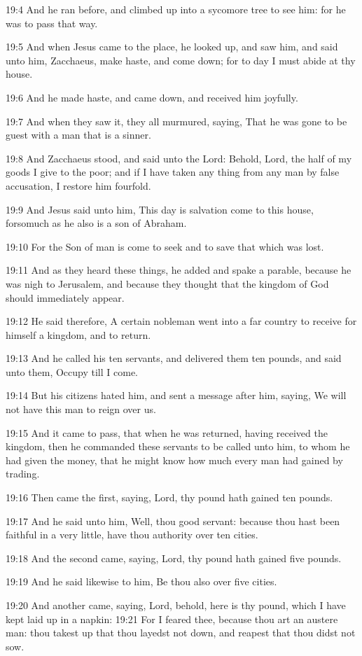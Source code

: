 19:4 And he ran before, and climbed up into a sycomore tree to see
him: for he was to pass that way.

19:5 And when Jesus came to the place, he looked up, and saw him, and
said unto him, Zacchaeus, make haste, and come down; for to day I must
abide at thy house.

19:6 And he made haste, and came down, and received him joyfully.

19:7 And when they saw it, they all murmured, saying, That he was gone
to be guest with a man that is a sinner.

19:8 And Zacchaeus stood, and said unto the Lord: Behold, Lord, the
half of my goods I give to the poor; and if I have taken any thing
from any man by false accusation, I restore him fourfold.

19:9 And Jesus said unto him, This day is salvation come to this
house, forsomuch as he also is a son of Abraham.

19:10 For the Son of man is come to seek and to save that which was
lost.

19:11 And as they heard these things, he added and spake a parable,
because he was nigh to Jerusalem, and because they thought that the
kingdom of God should immediately appear.

19:12 He said therefore, A certain nobleman went into a far country to
receive for himself a kingdom, and to return.

19:13 And he called his ten servants, and delivered them ten pounds,
and said unto them, Occupy till I come.

19:14 But his citizens hated him, and sent a message after him,
saying, We will not have this man to reign over us.

19:15 And it came to pass, that when he was returned, having received
the kingdom, then he commanded these servants to be called unto him,
to whom he had given the money, that he might know how much every man
had gained by trading.

19:16 Then came the first, saying, Lord, thy pound hath gained ten
pounds.

19:17 And he said unto him, Well, thou good servant: because thou hast
been faithful in a very little, have thou authority over ten cities.

19:18 And the second came, saying, Lord, thy pound hath gained five
pounds.

19:19 And he said likewise to him, Be thou also over five cities.

19:20 And another came, saying, Lord, behold, here is thy pound, which
I have kept laid up in a napkin: 19:21 For I feared thee, because thou
art an austere man: thou takest up that thou layedst not down, and
reapest that thou didst not sow.

